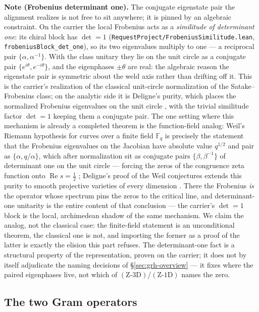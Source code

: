 \documentclass[11pt]{article}
\theoremstyle{definition}
\renewcommand{\Re}{\operatorname{Re}}
\begin{document}
\medskip
\noindent\textbf{Note (Frobenius determinant one).} The conjugate eigenstate pair the alignment
realizes is not free to sit anywhere; it is pinned by an algebraic constraint. On the carrier the
local Frobenius acts as a \emph{similitude of determinant one}: its chiral block has \(\det=1\)
(\texttt{RequestProject/FrobeniusSimilitude.lean}, \texttt{frobeniusBlock\_det\_one}), so its two
eigenvalues multiply to one --- a reciprocal pair \(\{\alpha,\alpha^{-1}\}\). With the class
unitary they lie on the unit circle as a conjugate pair \(\{e^{i\theta},e^{-i\theta}\}\), and the
eigenphases \(\pm\theta\) are real: the algebraic reason the eigenstate pair is symmetric about the
weld axis rather than drifting off it. This is the carrier's realization of the classical
unit-circle normalization of the Satake--Frobenius class; on the analytic side it is Deligne's
purity, which places the normalized Frobenius eigenvalues on the unit circle \cite{Deligne}, with
the trivial similitude factor \(\det=1\) keeping them a conjugate pair. The one setting where this
mechanism is already a completed theorem is the function-field analog: Weil's Riemann hypothesis for
curves over a finite field \(\mathbb F_q\) is precisely the statement that the Frobenius eigenvalues
on the Jacobian have absolute value \(q^{1/2}\) and pair as \(\{\alpha,q/\alpha\}\), which after
normalization sit as conjugate pairs \(\{\beta,\beta^{-1}\}\) of determinant one on the unit circle
--- forcing the zeros of the congruence zeta function onto \(\Re s=\tfrac12\) \cite{Weil}; Deligne's
proof of the Weil conjectures extends this purity to smooth projective varieties of every dimension
\cite{Deligne}. There the Frobenius \emph{is} the operator whose spectrum pins the zeros to the
critical line, and determinant-one unitarity is the entire content of that conclusion --- the
carrier's \(\det=1\) block is the local, archimedean shadow of the same mechanism. We claim the
analog, not the classical case: the finite-field statement is an unconditional theorem, the
classical one is not, and importing the former as a proof of the latter is exactly the elision this
part refuses. The determinant-one fact is
a structural property of the representation, proven on the carrier; it does not by itself adjudicate
the naming decisions of \S\ref{sec:grh-overview} --- it fixes where the paired eigenphases live, not
which of \((\text{Z-3D})\)/\((\text{Z-1D})\) names the zero.

\subsection{The two Gram operators}\label{sec:grh-operators}
\end{document}
